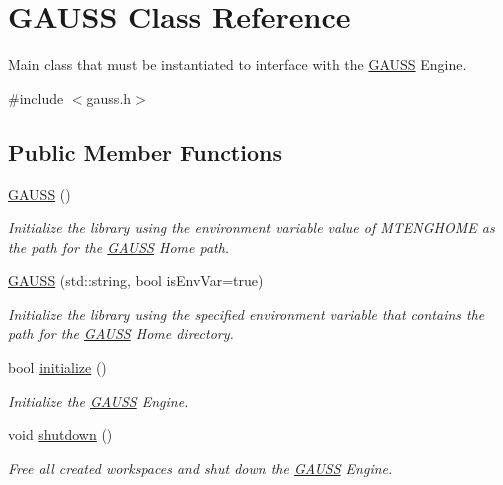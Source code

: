 \hypertarget{class_g_a_u_s_s}{\section{G\-A\-U\-S\-S Class Reference}
\label{class_g_a_u_s_s}
}


Main class that must be instantiated to interface with the \hyperlink{class_g_a_u_s_s}{G\-A\-U\-S\-S} Engine.  




{\ttfamily \#include $<$gauss.\-h$>$}

\subsection*{Public Member Functions}
\begin{DoxyCompactItemize}
\item 
\hyperlink{class_g_a_u_s_s_a693f5380e15621bb955989e243b902cd}{G\-A\-U\-S\-S} ()
\begin{DoxyCompactList}\small\item\em Initialize the library using the environment variable value of {\ttfamily M\-T\-E\-N\-G\-H\-O\-M\-E} as the path for the \hyperlink{class_g_a_u_s_s}{G\-A\-U\-S\-S} Home path. \end{DoxyCompactList}\item 
\hyperlink{class_g_a_u_s_s_a6983f26bb2c4f8852cb18ed31198fdb1}{G\-A\-U\-S\-S} (std\-::string, bool is\-Env\-Var=true)
\begin{DoxyCompactList}\small\item\em Initialize the library using the specified environment variable that contains the path for the \hyperlink{class_g_a_u_s_s}{G\-A\-U\-S\-S} Home directory. \end{DoxyCompactList}\item 
bool \hyperlink{class_g_a_u_s_s_aad9f7a3a527b9c5961d1cc1b1aa9066c}{initialize} ()
\begin{DoxyCompactList}\small\item\em Initialize the \hyperlink{class_g_a_u_s_s}{G\-A\-U\-S\-S} Engine. \end{DoxyCompactList}\item 
void \hyperlink{class_g_a_u_s_s_a71721c595c12c94616ef414879c95460}{shutdown} ()
\begin{DoxyCompactList}\small\item\em Free all created workspaces and shut down the \hyperlink{class_g_a_u_s_s}{G\-A\-U\-S\-S} Engine. \end{DoxyCompactList}\item 

\end{DoxyCompactItemize}
